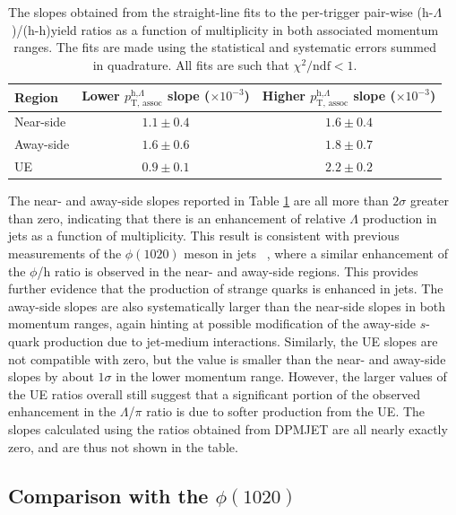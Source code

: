 \begin{table}
\centering
\caption{The slopes obtained from the straight-line fits to the per-trigger pair-wise (h-$\Lambda$)/(h-h)yield ratios as a function of multiplicity in both associated momentum ranges. The fits are made using the statistical and systematic errors summed in quadrature. All fits are such that $\chi^{2}/\text{ndf} < 1$.}
\begin{tabular}{l c c}
\hline
Region & Lower $p_{\text{T, assoc}}^{\text{h,}\Lambda}$ slope ($\times10^{-3}$) & Higher $p_{\text{T, assoc}}^{\text{h,}\Lambda}$  slope ($\times10^{-3}$) \\
\hline
Near-side & $1.1 \pm 0.4$ & $1.6 \pm 0.4$ \\
Away-side & $1.6 \pm 0.6$ & $1.8 \pm 0.7$ \\
UE & $0.9 \pm 0.1$ & $2.2 \pm 0.2$ \\
\hline
\end{tabular}
\label{tab:lambda_hadron_slopes}
\end{table}


The near- and away-side slopes reported in Table \ref{tab:lambda_hadron_slopes} are all more than $2\sigma$ greater than zero, indicating that there is an enhancement of relative $\Lambda$ production in jets as a function of multiplicity. This result is consistent with previous measurements of the $\phi(1020)$ meson in jets ~\cite{JustinPaper}, where a similar enhancement of the $\phi$/h ratio is observed in the near- and away-side regions. This provides further evidence that the production of strange quarks is enhanced in jets. The away-side slopes are also systematically larger than the near-side slopes in both momentum ranges, again hinting at possible modification of the away-side $s$-quark production due to jet-medium interactions. Similarly, the UE slopes are not compatible with zero, but the value is smaller than the near- and away-side slopes by about $1\sigma$ in the lower momentum range. However, the larger values of the UE ratios overall still suggest that a significant portion of the observed enhancement in the $\Lambda$/$\pi$ ratio is due to softer production from the UE. The slopes calculated using the ratios obtained from DPMJET are all nearly exactly zero, and are thus not shown in the table.



\subsection{Comparison with the $\phi(1020)$}

